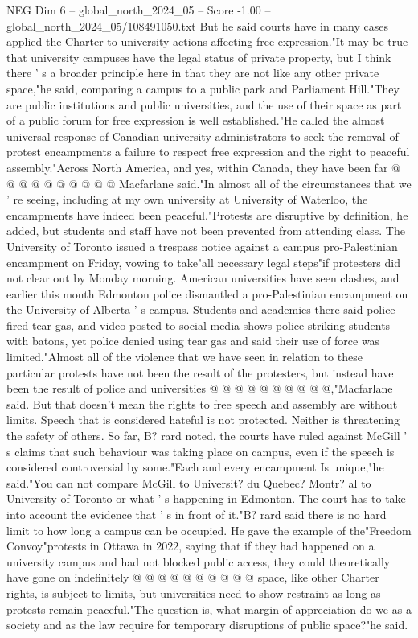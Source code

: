 \begin{textsample}{NEG Dim 6 – global\_north\_2024\_05 – Score -1.00 – global\_north\_2024\_05/108491050.txt}
But he said courts have in many cases applied the Charter to university actions affecting free expression."It may be true that university campuses have the legal status of private property, but I think there ' s a broader principle here in that they are not like any other private space,"he said, comparing a campus to a public park and Parliament Hill."They are public institutions and public universities, and the use of their space as part of a public forum for free expression is well established."He called the almost universal response of Canadian university administrators to seek the removal of protest encampments a failure to respect free expression and the right to peaceful assembly."Across North America, and yes, within Canada, they have been far @ @ @ @ @ @ @ @ @ @ Macfarlane said."In almost all of the circumstances that we ' re seeing, including at my own university at University of Waterloo, the encampments have indeed been peaceful."Protests are disruptive by definition, he added, but students and staff have not been prevented from attending class.
The University of Toronto issued a trespass notice against a campus pro-Palestinian encampment on Friday, vowing to take"all necessary legal steps"if protesters did not clear out by Monday morning.
American universities have seen clashes, and earlier this month Edmonton police dismantled a pro-Palestinian encampment on the University of Alberta ' s campus.
Students and academics there said police fired tear gas, and video posted to social media shows police striking students with batons, yet police denied using tear gas and said their use of force was limited."Almost all of the violence that we have seen in relation to these particular protests have not been the result of the protesters, but instead have been the result of police and universities @ @ @ @ @ @ @ @ @ @,"Macfarlane said.
But that doesn't mean the rights to free speech and assembly are without limits.
Speech that is considered hateful is not protected.
Neither is threatening the safety of others.
So far, B? rard noted, the courts have ruled against McGill ' s claims that such behaviour was taking place on campus, even if the speech is considered controversial by some."Each and every encampment Is unique,"he said."You can not compare McGill to Universit? du Quebec?
Montr? al to University of Toronto or what ' s happening in Edmonton.
The court has to take into account the evidence that ' s in front of it."B? rard said there is no hard limit to how long a campus can be occupied.
He gave the example of the"Freedom Convoy"protests in Ottawa in 2022, saying that if they had happened on a university campus and had not blocked public access, they could theoretically have gone on indefinitely @ @ @ @ @ @ @ @ @ @ space, like other Charter rights, is subject to limits, but universities need to show restraint as long as protests remain peaceful."The question is, what margin of appreciation do we as a society and as the law require for temporary disruptions of public space?"he said.

\end{textsample}
